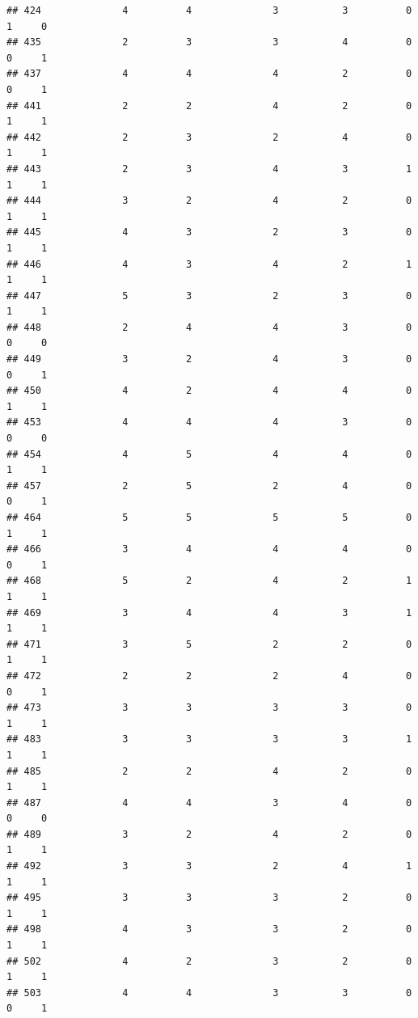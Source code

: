 \documentclass[
]{article}
\begin{document}
\begin{verbatim}
## 424              4          4              3           3          0    1     0
## 435              2          3              3           4          0    0     1
## 437              4          4              4           2          0    0     1
## 441              2          2              4           2          0    1     1
## 442              2          3              2           4          0    1     1
## 443              2          3              4           3          1    1     1
## 444              3          2              4           2          0    1     1
## 445              4          3              2           3          0    1     1
## 446              4          3              4           2          1    1     1
## 447              5          3              2           3          0    1     1
## 448              2          4              4           3          0    0     0
## 449              3          2              4           3          0    0     1
## 450              4          2              4           4          0    1     1
## 453              4          4              4           3          0    0     0
## 454              4          5              4           4          0    1     1
## 457              2          5              2           4          0    0     1
## 464              5          5              5           5          0    1     1
## 466              3          4              4           4          0    0     1
## 468              5          2              4           2          1    1     1
## 469              3          4              4           3          1    1     1
## 471              3          5              2           2          0    1     1
## 472              2          2              2           4          0    0     1
## 473              3          3              3           3          0    1     1
## 483              3          3              3           3          1    1     1
## 485              2          2              4           2          0    1     1
## 487              4          4              3           4          0    0     0
## 489              3          2              4           2          0    1     1
## 492              3          3              2           4          1    1     1
## 495              3          3              3           2          0    1     1
## 498              4          3              3           2          0    1     1
## 502              4          2              3           2          0    1     1
## 503              4          4              3           3          0    0     1

\end{verbatim}
\end{document}
